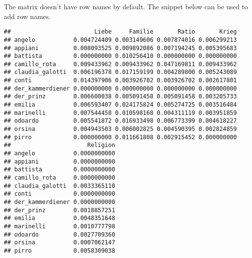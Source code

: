 \documentclass[]{book}
\newenvironment{Shaded}{\begin{snugshade}}{\end{snugshade}}
\newcommand{\DataTypeTok}[1]{\textcolor[rgb]{0.13,0.29,0.53}{#1}}
\newcommand{\FloatTok}[1]{\textcolor[rgb]{0.00,0.00,0.81}{#1}}
\newcommand{\KeywordTok}[1]{\textcolor[rgb]{0.13,0.29,0.53}{\textbf{#1}}}
\newcommand{\NormalTok}[1]{#1}
\newcommand{\OperatorTok}[1]{\textcolor[rgb]{0.81,0.36,0.00}{\textbf{#1}}}
\newcommand{\OtherTok}[1]{\textcolor[rgb]{0.56,0.35,0.01}{#1}}
\newcommand{\StringTok}[1]{\textcolor[rgb]{0.31,0.60,0.02}{#1}}
\begin{document}
The matrix doesn't have row names by default. The snippet below can be used to add row names.

\begin{Shaded}
\end{Shaded}

\begin{verbatim}
##                        Liebe     Familie       Ratio       Krieg
## angelo           0.004724409 0.003149606 0.007874016 0.006299213
## appiani          0.008093525 0.009892086 0.007194245 0.005395683
## battista         0.000000000 0.010256410 0.000000000 0.000000000
## camillo_rota     0.009433962 0.009433962 0.047169811 0.009433962
## claudia_galotti  0.006196378 0.017159199 0.004289800 0.005243089
## conti            0.014397906 0.003926702 0.003926702 0.002617801
## der_kammerdiener 0.000000000 0.000000000 0.000000000 0.000000000
## der_prinz        0.006600038 0.005091458 0.005091458 0.003205733
## emilia           0.006593407 0.024175824 0.005274725 0.003516484
## marinelli        0.007544458 0.010598168 0.004311119 0.003951859
## odoardo          0.005541872 0.016933498 0.006773399 0.004618227
## orsina           0.004943503 0.006002825 0.004590395 0.002824859
## pirro            0.000000000 0.011661808 0.002915452 0.000000000
##                      Religion
## angelo           0.0000000000
## appiani          0.0000000000
## battista         0.0000000000
## camillo_rota     0.0000000000
## claudia_galotti  0.0033365110
## conti            0.0000000000
## der_kammerdiener 0.0000000000
## der_prinz        0.0018857251
## emilia           0.0048351648
## marinelli        0.0010777798
## odoardo          0.0027709360
## orsina           0.0007062147
## pirro            0.0058309038
\end{verbatim}
\end{document}

